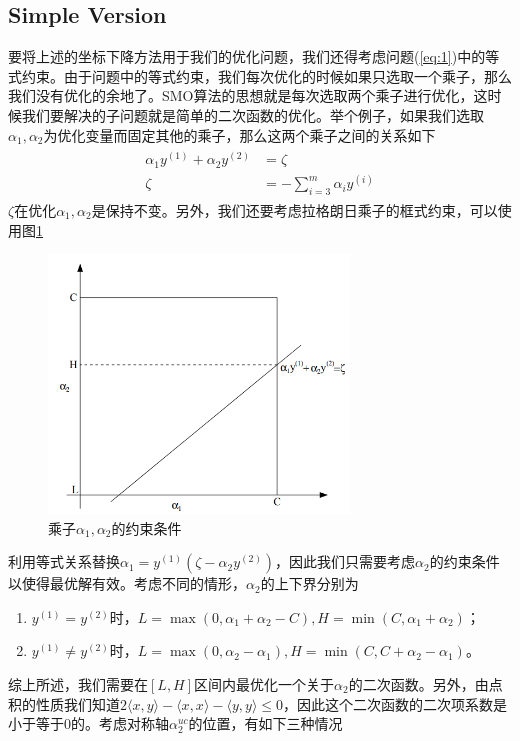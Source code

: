 \documentclass[11pt]{article}
\begin{document}
\subsection{Simple Version}
要将上述的坐标下降方法用于我们的优化问题，我们还得考虑问题(\ref{eq:1})中的等式约束。由于问题中的等式约束，我们每次优化的时候如果只选取一个乘子，那么我们没有优化的余地了。SMO算法的思想就是每次选取两个乘子进行优化，这时候我们要解决的子问题就是简单的二次函数的优化。举个例子，如果我们选取$\alpha_1, \alpha_2$为优化变量而固定其他的乘子，那么这两个乘子之间的关系如下
\begin{align}
\begin{split}
\alpha_1y^{(1)} + \alpha_2y^{(2)} &= \zeta\\
\zeta &=-\sum_{i=3}^m \alpha_iy^{(i)}
\end{split}
\end{align}
$\zeta$在优化$\alpha_1, \alpha_2$是保持不变。另外，我们还要考虑拉格朗日乘子的框式约束，可以使用图\ref{img:lh}
\begin{figure}
\centering
\includegraphics[width=8cm]{images/img14.png}
\caption{乘子$\alpha_1, \alpha_2$的约束条件}
\label{img:lh}
\end{figure}
利用等式关系替换$\alpha_1 = y^{(1)}(\zeta - \alpha_2y^{(2)})$，因此我们只需要考虑$\alpha_2$的约束条件以使得最优解有效。考虑不同的情形，$\alpha_2$的上下界分别为
\begin{enumerate}
\item $y^{(1)} = y^{(2)}$时，$L=\max(0, \alpha_1 + \alpha_2 - C), H=\min(C, \alpha_1+\alpha_2)$；
\item $y^{(1)} \neq y^{(2)}$时，$L=\max(0, \alpha_2-\alpha_1), H=\min(C, C+\alpha_2-\alpha_1)$。
\end{enumerate}
综上所述，我们需要在$[L, H]$区间内最优化一个关于$\alpha_2$的二次函数。另外，由点积的性质我们知道$2\langle x, y\rangle-\langle x, x\rangle - \langle y, y\rangle \leq 0$，因此这个二次函数的二次项系数是小于等于0的。考虑对称轴$\alpha^{uc}_2$的位置，有如下三种情况
\end{document}
